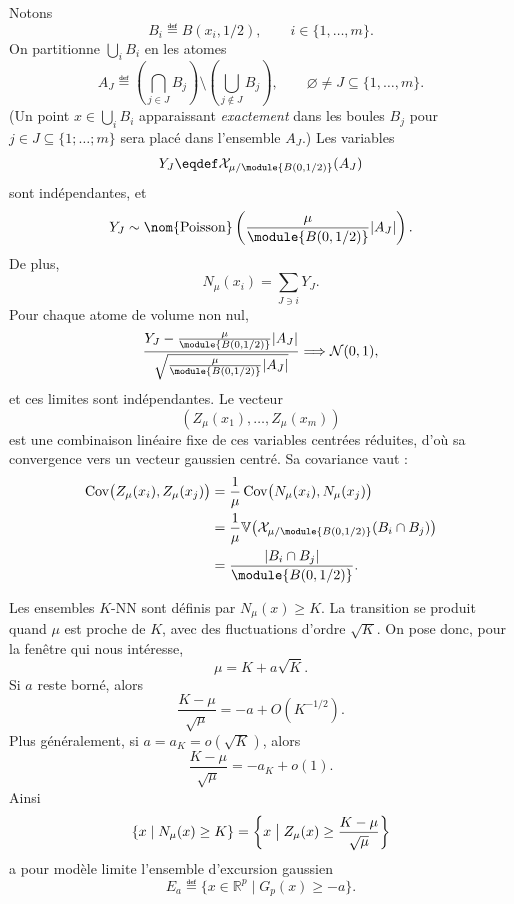 \begin{Preuve}
Notons
\[
    B_i \eqdef B(x_i,1/2),
    \qquad i\in\{1,\ldots,m\}.
\]
On partitionne $\bigcup_i B_i$ en les atomes
\[
    A_J
    \eqdef
    \left(\bigcap_{j\in J}B_j\right)
    \setminus
    \left(\bigcup_{j\notin J}B_j\right),
    \qquad
    \varnothing\neq J\subseteq\{1,\ldots,m\}.
\]
(Un point $x \in \bigcup_i B_i$ apparaissant \emph{exactement} dans les boules $B_j$ pour $j \in J \subseteq\bigl\{ 1 ; \ldots ; m\bigr\}$ sera placé dans l'ensemble $A_J$.)
Les variables
\[
    Y_J\eqdef \mathcal X_{\mu/\module{B(0,1/2)}}(A_J)
\]
sont indépendantes, et
\[
    Y_J\sim \operatorname{\nom{Poisson}}\left(\frac{\mu}{\module{B(0,1/2)}}|A_J|\right).
\]
De plus,
\[
    N_\mu(x_i)=\sum_{J\ni i}Y_J.
\]
Pour chaque atome de volume non nul,
\[
    \frac{Y_J-\frac{\mu}{\module{B(0,1/2)}}|A_J|}
         {\sqrt{\frac{\mu}{\module{B(0,1/2)}}|A_J|}}
    \Longrightarrow
    \mathcal N(0,1),
\]
et ces limites sont indépendantes. Le vecteur
\[
    \left(Z_\mu(x_1),\ldots,Z_\mu(x_m)\right)
\]
est une combinaison linéaire fixe de ces variables centrées réduites, d'où sa convergence vers un vecteur gaussien centré. Sa covariance vaut :
\[
\begin{split}
    \operatorname{Cov}\bigl(Z_\mu(x_i),Z_\mu(x_j)\bigr)
    &=
    \frac1\mu
    \operatorname{Cov}\bigl(N_\mu(x_i),N_\mu(x_j)\bigr)\\
    &=
    \frac1\mu
    \mathbb V \bigl(\mathcal X_{\mu/\module{B(0,1/2)}}(B_i\cap B_j)\bigr)\\
    &=
    \frac{|B_i\cap B_j|}{\module{B(0,1/2)}}.
\end{split}
\]
\end{Preuve}

Les ensembles $K$-NN sont définis par $N_\mu(x) \ge K$. La transition se produit quand $\mu$ est proche de $K$, avec des fluctuations d'ordre $\sqrt K$. On pose donc, pour la fenêtre qui nous intéresse,
\[
    \mu = K+a\sqrt K.
\]
Si $a$ reste borné, alors
\[
    \frac{K-\mu}{\sqrt\mu}
    =
    -a+O(K^{-1/2}).
\]
Plus généralement, si $a=a_K=o(\sqrt K)$, alors
\[
    \frac{K-\mu}{\sqrt\mu}
    =
    -a_K+o(1).
\]
Ainsi
\[
    \{x \mid N_\mu(x)\ge K\}
    =
    \left\{
        x \bigm| Z_\mu(x)\ge \frac{K-\mu}{\sqrt\mu}
    \right\}
\]
a pour modèle limite l'ensemble d'excursion gaussien
\[
    E_a
    \eqdef
    \{x\in\mathbb R^p \mid G_p(x)\ge -a\}.
\]

